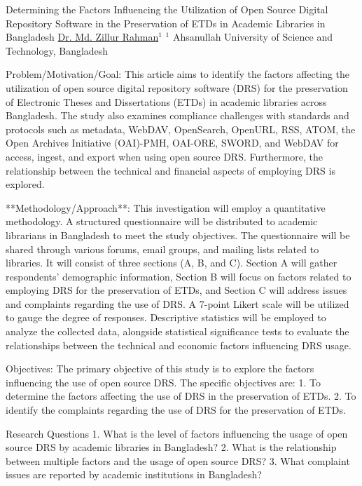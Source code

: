 
    \begin{abstract_online}{Determining the Factors Influencing the Utilization of Open Source Digital Repository Software in the Preservation of ETDs in Academic Libraries in Bangladesh}{%
    \underline{Dr. Md. Zillur Rahman}$^{1}$}{%
    }{%
    $^1$ Ahsanullah University of Science and Technology, Bangladesh
}

Problem/Motivation/Goal: This article aims to identify the factors affecting the utilization of open source digital repository software (DRS) for the preservation of Electronic Theses and Dissertations (ETDs) in academic libraries across Bangladesh. The study also examines compliance challenges with standards and protocols such as metadata, WebDAV, OpenSearch, OpenURL, RSS, ATOM, the Open Archives Initiative (OAI)-PMH, OAI-ORE, SWORD, and WebDAV for access, ingest, and export when using open source DRS. Furthermore, the relationship between the technical and financial aspects of employing DRS is explored.

**Methodology/Approach**: This investigation will employ a quantitative methodology. A structured questionnaire will be distributed to academic librarians in Bangladesh to meet the study objectives. The questionnaire will be shared through various forums, email groups, and mailing lists related to libraries. It will consist of three sections (A, B, and C). Section A will gather respondents' demographic information, Section B will focus on factors related to employing DRS for the preservation of ETDs, and Section C will address issues and complaints regarding the use of DRS. A 7-point Likert scale will be utilized to gauge the degree of responses. Descriptive statistics will be employed to analyze the collected data, alongside statistical significance tests to evaluate the relationships between the technical and economic factors influencing DRS usage.

Objectives: The primary objective of this study is to explore the factors influencing the use of open source DRS. The specific objectives are:
1. To determine the factors affecting the use of DRS in the preservation of ETDs.
2. To identify the complaints regarding the use of DRS for the preservation of ETDs.

Research Questions
1. What is the level of factors influencing the usage of open source DRS by academic libraries in Bangladesh?
2. What is the relationship between multiple factors and the usage of open source DRS?
3. What complaint issues are reported by academic institutions in Bangladesh?


\end{abstract_online}
